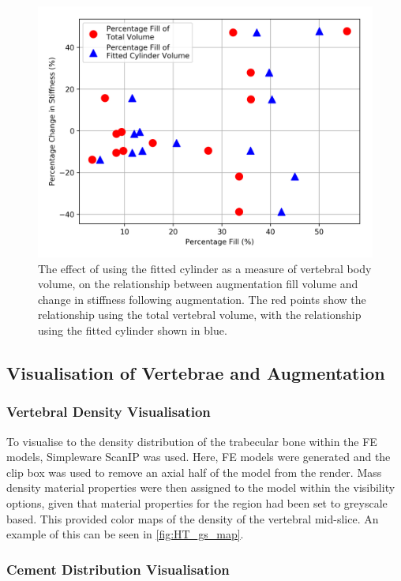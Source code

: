 \begin{figure}[ht!]
  \centering
 
\includegraphics[width=.7\textwidth]{Chapters/Chapter_HT_images/cyl_fit_comparison.png}
  \caption{The effect of using the fitted cylinder as a measure of vertebral
body volume, on the relationship between augmentation fill volume and change in
stiffness following augmentation. The red points show the relationship using
the total vertebral volume, with the relationship using the fitted cylinder
shown in blue.}
  \label{fig:cyl_fit_comparison}
\end{figure}


\subsection{Visualisation of Vertebrae and Augmentation}

\subsubsection{Vertebral Density Visualisation}

To visualise to the density distribution of the trabecular bone within the FE
models, Simpleware ScanIP was used. Here, FE models were generated and the clip
box was used to remove an axial half of the model from the render. Mass density
material properties were then assigned to the model within the visibility
options, given that material properties for the region had been set to
greyscale based. This provided color maps of the density of the vertebral
mid-slice. An example of this can be seen in \cref{fig:HT_gs_map}.

\subsubsection{Cement Distribution  Visualisation}

